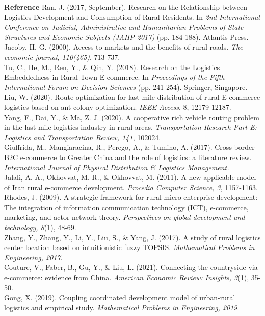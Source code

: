\documentclass{article}
\newcommand{\sihao}{\fontsize{14pt}{21pt}\selectfont}            %
\begin{document}
{\bfseries\sihao Reference}
Ran, J. (2017, September). Research on the Relationship between Logistics Development and Consumption of Rural Residents. In {\it 2nd International Conference on Judicial, Administrative and Humanitarian Problems of State Structures and Economic Subjects (JAHP 2017)} (pp. 184-188). Atlantis Press.\\
Jacoby, H. G. (2000). Access to markets and the benefits of rural roads. {\it The economic journal, 110(465)}, 713-737.\\
Tu, C., He, M., Ren, Y., \& Qin, Y. (2018). Research on the Logistics Embeddedness in Rural Town E-commerce. In {\it Proceedings of the Fifth International Forum on Decision Sciences} (pp. 241-254). Springer, Singapore.\\
Liu, W. (2020). Route optimization for last-mile distribution of rural E-commerce logistics based on ant colony optimization. {\it IEEE Access}, 8, 12179-12187.\\
Yang, F., Dai, Y., \& Ma, Z. J. (2020). A cooperative rich vehicle routing problem in the last-mile logistics industry in rural areas. {\it Transportation Research Part E: Logistics and Transportation Review, 141}, 102024.\\
Giuffrida, M., Mangiaracina, R., Perego, A., \& Tumino, A. (2017). Cross-border B2C e-commerce to Greater China and the role of logistics: a literature review. {\it International Journal of Physical Distribution \& Logistics Management.}\\
Jalali, A. A., Okhovvat, M. R., \& Okhovvat, M. (2011). A new applicable model of Iran rural e-commerce development. {\it Procedia Computer Science, 3}, 1157-1163.\\
Rhodes, J. (2009). A strategic framework for rural micro-enterprise development: The integration of information communication technology (ICT), e-commerce, marketing, and actor-network theory. {\it Perspectives on global development and technology, 8}(1), 48-69.\\
Zhang, Y., Zhang, Y., Li, Y., Liu, S., \& Yang, J. (2017). A study of rural logistics center location based on intuitionistic fuzzy TOPSIS. {\it Mathematical Problems in Engineering, 2017}.\\
Couture, V., Faber, B., Gu, Y., \& Liu, L. (2021). Connecting the countryside via e-commerce: evidence from China. {\it American Economic Review: Insights, 3}(1), 35-50.\\
Gong, X. (2019). Coupling coordinated development model of urban-rural logistics and empirical study. {\it Mathematical Problems in Engineering, 2019}.\\
\end{document}
